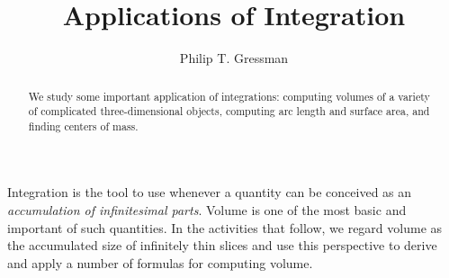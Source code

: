 \documentclass{ximera}
\title{Applications of Integration}
\author{Philip T. Gressman}
\begin{document}
\begin{abstract}
  We study some important application of integrations: computing volumes of a variety of complicated three-dimensional objects, computing arc length and surface area, and finding centers of mass.
\end{abstract}
\maketitle

Integration is the tool to use whenever a quantity can be conceived as an \textit{accumulation of infinitesimal parts}. 
Volume is one of the most basic and important of such quantities. In the activities that follow, we regard volume as the accumulated size of infinitely thin slices and use this perspective to derive and apply a number of formulas for computing volume.
\end{document}
